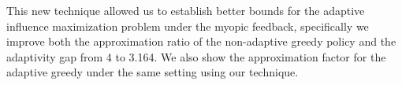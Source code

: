 This new technique allowed us to establish better bounds for the adaptive influence maximization problem under the myopic feedback, specifically we improve both the approximation ratio of the non-adaptive greedy policy and the adaptivity gap from 4 to 3.164. We also show the approximation factor for the adaptive greedy under the same setting using our technique.
